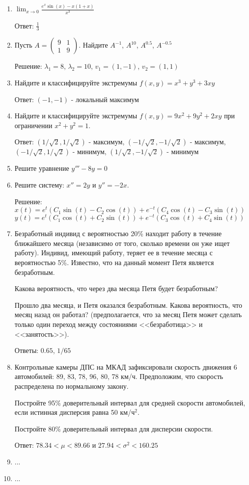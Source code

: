 \documentclass[pdftex,12pt,a4paper]{article}
\begin{document}
\begin{enumerate}
\item $\lim_{x\to 0}\frac{e^{x}\sin(x)-x(1+x)}{x^{3}}$

Ответ: $\frac{1}{3}$

\item Пусть $A=\left(\begin{array}{cc}9 & 1 \\ 1 & 9 \end{array}\right)$. Найдите $A^{-1}$, $A^{10}$, $A^{0.5}$, $A^{-0.5}$

Решение: $\lambda_{1}=8$, $\lambda_{2}=10$, $v_{1}=(1,-1)$, $v_{2}=(1,1)$

\item Найдите и классифицируйте экстремумы $f(x,y)=x^{3}+y^{3}+3xy$

Ответ: $(-1,-1)$ - локальный максимум

\item Найдите и классифицируйте экстремумы $f(x,y)=9x^{2}+9y^{2}+2xy$ при ограничении $x^{2}+y^{2}=1$.

Ответ: $(1/\sqrt{2},1/\sqrt{2})$ - максимум, $(-1/\sqrt{2},-1/\sqrt{2})$ - максимум, $(-1/\sqrt{2},1/\sqrt{2})$ - минимум, $(1/\sqrt{2},-1/\sqrt{2})$ - минимум

\item Решите уравнение $y'''-8y=0$

\item Решите систему: $x''=2y$ и $y''=-2x$.

Решение: $x(t)=e^{t}(C_{1}\sin(t)-C_{2}\cos(t))+e^{-t}(C_{4}\cos(t)-C_{3}\sin(t))$
$y(t)=e^{t}(C_{1}\cos(t)+C_{2}\sin(t))+e^{-t}(C_{3}\cos(t)+C_{4}\sin(t))$

\item Безработный индивид с вероятностью 20\% находит работу в течение ближайшего месяца (независимо от того, сколько времени он уже ищет работу). Индивид, имеющий работу, теряет ее в течение месяца с вероятностью 5\%. Известно, что на данный момент Петя является безработным.

Какова вероятность, что через два месяца Петя будет безработным?

Прошло два месяца, и Петя оказался безработным. Какова вероятность, что месяц назад он работал? (предполагается, что за месяц Петя может сделать только один переход между состояниями <<безработица>> и <<занятость>>).

Ответы: $0.65$, $1/65$

\item Контрольные камеры ДПС на МКАД зафиксировали скорость движения 6 автомобилей: 89, 83, 78, 96, 80, 78 км/ч. Предположим, что скорость распределена по нормальному закону.

Постройте 95\% доверительный интервал для средней скорости автомобилей, если истинная дисперсия равна 50 км/ч$^2$.

Постройте 80\% доверительный интервал для дисперсии скорости.

Ответ: $78.34<\mu<89.66$ и $27.94<\sigma^{2}<160.25$

\item ...
\item ...

\end{enumerate}
\end{document}
